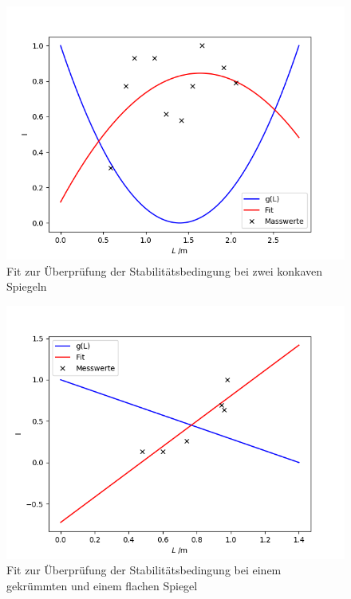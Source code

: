 \begin{figure}[h!]
	\centering
	\includegraphics[width=.6\textwidth]{FitCurved.png}
	\caption{Fit zur Überprüfung der Stabilitätsbedingung bei zwei konkaven Spiegeln}
	\label{fig:fitcurved}
\end{figure}
\begin{figure}[h!]
	\centering
	\includegraphics[width=.6\textwidth]{FitFlat.png}
	\caption{Fit zur Überprüfung der Stabilitätsbedingung bei einem gekrümmten und einem flachen Spiegel}
	\label{fig:fitflat}
\end{figure}